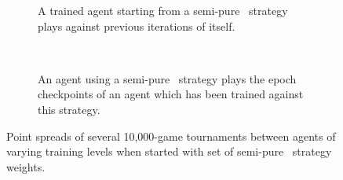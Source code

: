 
\begin{figure}
\center


\begin{subfigure}[b]{0.45\textwidth}
	\caption{
		A trained agent starting from a semi-pure \handmaxavg\ strategy
		plays against previous iterations of itself.
	}
	\label{fig:expts-sanitycheck-spreads-a}
\end{subfigure}
~
\begin{subfigure}[b]{0.45\textwidth}
	\caption{
		An agent using a semi-pure \handmaxavg\ strategy
		plays the epoch checkpoints of an agent which has been trained
		against this strategy.
	}
	\label{fig:expts-sanitycheck-spreads-b}
\end{subfigure}

\caption{
	Point spreads of several 10,000-game tournaments
	between agents of varying training levels
	when started with set of semi-pure \handmaxavg\ strategy weights.
}
\label{fig:expts-sanitycheck-spreads}
\end{figure}
